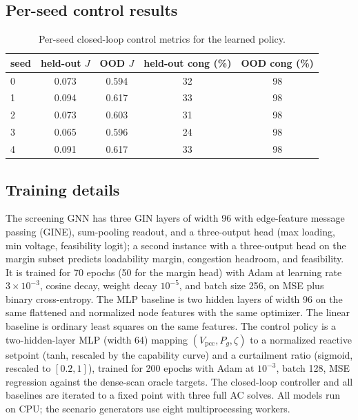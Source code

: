 \documentclass{article}
\newcommand{\pcc}{\mathrm{pcc}}
\newcommand{\zt}{\zeta}
\begin{document}
\subsection{Per-seed control results}

\begin{table}[ht]
  \centering
  \small
  \begin{tabular}{lcccc}
    \toprule
    seed & held-out $J$ & OOD $J$ & held-out cong (\%) & OOD cong (\%) \\
    \midrule
    0 & 0.073 & 0.594 & 32 & 98 \\
    1 & 0.094 & 0.617 & 33 & 98 \\
    2 & 0.073 & 0.603 & 31 & 98 \\
    3 & 0.065 & 0.596 & 24 & 98 \\
    4 & 0.091 & 0.617 & 33 & 98 \\
    \bottomrule
  \end{tabular}
  \caption{Per-seed closed-loop control metrics for the learned policy.}
  \label{tab:perseed_ctrl}
\end{table}

\subsection{Training details}
The screening GNN has three GIN layers of width 96 with edge-feature
message passing (GINE), sum-pooling readout, and a three-output head
(max loading, min voltage, feasibility logit); a second instance with a
three-output head on the margin subset predicts loadability margin,
congestion headroom, and feasibility. It is trained for 70 epochs (50 for
the margin head) with Adam at learning rate $3\times10^{-3}$, cosine decay,
weight decay $10^{-5}$, and batch size 256, on MSE plus binary
cross-entropy. The MLP baseline is two hidden layers of width 96 on the
same flattened and normalized node features with the same optimizer. The
linear baseline is ordinary least squares on the same features. The control
policy is a two-hidden-layer MLP (width 64) mapping
$(V_{\pcc}, P_g, \zt)$ to a normalized reactive setpoint (tanh, rescaled by
the capability curve) and a curtailment ratio (sigmoid, rescaled to
$[0.2,1]$), trained for 200 epochs with Adam at $10^{-3}$, batch 128, MSE
regression against the dense-scan oracle targets. The closed-loop
controller and all baselines are iterated to a fixed point with three full
AC solves. All models run on CPU; the scenario generators use eight
multiprocessing workers.
\end{document}
